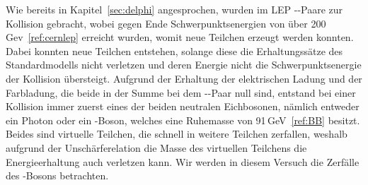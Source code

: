 \documentclass[a4paper,ngerman]{scrartcl}
\begin{document}
Wie bereits in Kapitel~\ref{sec:delphi} angesprochen, wurden im LEP \Pelectron-\APelectron-Paare zur Kollision gebracht, wobei gegen Ende Schwerpunktsenergien von über 200\,Gev~\ref{ref:cernlep} erreicht wurden,
womit neue Teilchen erzeugt werden konnten.
Dabei konnten neue Teilchen entstehen, 
solange diese die Erhaltungssätze des Standardmodells nicht verletzen 
und deren Energie nicht die Schwerpunktsenergie der Kollision übersteigt.
Aufgrund der Erhaltung der elektrischen Ladung und der Farbladung, 
die beide in der Summe bei dem \Pelectron-\APelectron-Paar null sind,
entstand bei einer Kollision immer zuerst eines der beiden neutralen Eichbosonen,
nämlich entweder ein Photon oder ein \PZzero-Boson,
welches eine Ruhemasse von 91\,GeV~\ref{ref:BB} besitzt.
Beides sind virtuelle Teilchen, die schnell in weitere Teilchen zerfallen,
weshalb aufgrund der Unschärferelation die Masse des virtuellen
Teilchens die Energieerhaltung auch verletzen kann.
Wir werden in diesem Versuch die Zerfälle des \PZzero-Bosons betrachten.\\
\end{document}
